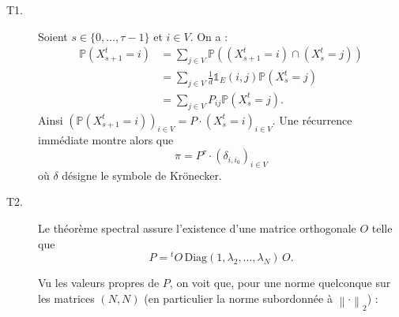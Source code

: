 \documentclass[11pt]{article}
\renewcommand{\P}{\mathbb{P}}
\newcommand{\ind}{\mathds{1}}
\theoremstyle{plain}
\begin{document}
\begin{description}
    \item[T1.\label{q:t1}] Soient $s \in \{0, \ldots, \tau - 1\}$ et $i \in V$. On a :
    \begin{align*}
    \P(X_{s+1}^{t} = i) & = \sum_{j \in V} \P((X_{s+1}^{t} = i) \cap (X_{s}^{t} = j))\\
    & = \sum_{j \in V}  \frac{1}{d}\ind_{E}(i,j) \P (X_{s}^{t} = j)\\
    & = \sum_{j \in V} P_{ij}\P (X_{s}^{t} = j).
    \end{align*}
    Ainsi $\left(\P(X_{s+1}^{t} = i)\right)_{i \in V} = P \cdot (X_{s}^{t} = i)_{i \in V}$. Une récurrence immédiate montre alors que
    \begin{equation}\label{eq:t1}
    \pi = P^{\tau} \cdot (\delta_{i,i_0})_{i \in V}
    \end{equation}
    où $\delta$ désigne le symbole de Krönecker.

    \item[T2.\label{q:t2}] Le théorème spectral assure l'existence d'une matrice orthogonale $O$ telle que
    \begin{equation*}\label{eq:diagonalisation}
    P = {}^{t}O \,\mathrm{Diag}(1,\lambda_2, \ldots, \lambda_N)\, O.
    \end{equation*}
     
    Vu les valeurs propres de $P$, on voit que, pour une norme quelconque sur les matrices $(N,N)$ (en particulier la norme subordonnée à $\left\lVert \cdot \right\rVert_2$) :
    

\end{description}
\end{document}
